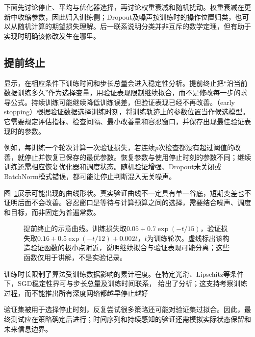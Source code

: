 下面先讨论停止、平均与优化器选择，再讨论权重衰减和随机扰动。权重衰减在更新中收缩参数，因此归入训练侧；Dropout及噪声按训练时的操作位置归类，也可以从随机计算的期望损失理解。后一联系说明分类并非互斥的数学定理，但有助于实现时明确该修改发生在哪里。

\subsection{提前终止}
\label{sec:generalization-early-stopping}

显示，在相应条件下训练时间和步长总量会进入稳定性分析。提前终止把“沿当前数据训练多久”作为选择变量，用验证表现限制继续拟合，而不是修改每一步的求导公式。持续训练可能继续降低训练误差，但验证表现已经不再改善。（early stopping）根据验证数据选择训练时刻，将训练轨迹上的参数位置当作候选模型。它需要规定评估指标、检查间隔、最小改善量和容忍窗口，并保存出现最佳验证表现时的参数。

例如，每训练一个轮次计算一次验证损失，若连续$p$次检查都没有超过阈值的改善，就停止并恢复已保存的最优参数。恢复参数与使用停止时刻的参数不同；继续训练还需相应恢复优化器和调度状态。随机验证增强、Dropout未关闭或BatchNorm模式错误，都可能让停止判断混入无关噪声。

图~\ref{fig:generalization-early-stopping}展示可能出现的曲线形状。真实验证曲线不一定具有单一谷底，短期变差也不证明后面不会改善。容忍窗口是等待与计算预算之间的选择，需要结合噪声、调度和目标，而非固定为普遍常数。
\begin{figure}[htbp]
  \centering
  
  \caption{提前终止的示意曲线。训练损失取$0.05+0.7\exp(-t/15)$，验证损失取$0.16+0.5\exp(-t/12)+0.002t$，$t$为训练轮次。虚线标出该构造验证函数的极小点附近，说明继续拟合与验证表现可能分离；这些函数仅用于讲解，不是实验记录。}
  \label{fig:generalization-early-stopping}
\end{figure}

训练时长限制了算法受训练数据影响的累计程度。在特定光滑、Lipschitz等条件下，SGD稳定性界可与步长总量及训练时间联系，
给出了分析；这支持考察训练过程，而不能推出所有深度网络都越早停止越好

验证集被用于选择停止时刻，反复尝试很多策略还可能对验证集过拟合。因此，最终测试应在策略确定后进行；时间序列和持续感知的验证还需模拟实际状态保留和未来信息边界。

